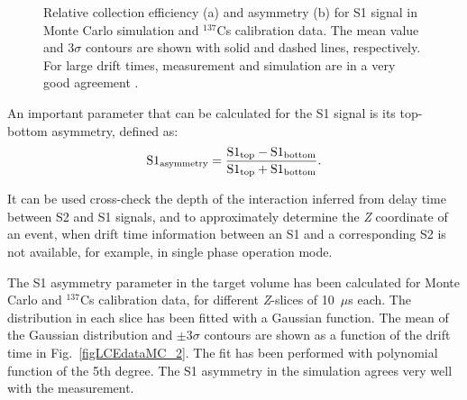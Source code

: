 \begin{figure}[!h]
\centering
{}
\caption[Relative collection efficiency and asymmetry for S1 signal in Monte Carlo simulation and $^{137}$Cs data]{Relative collection efficiency (a) and asymmetry (b) for S1 signal in Monte Carlo simulation and $^{137}$Cs calibration data. The mean value and 3$\sigma$ contours are shown with solid and dashed lines, respectively. For large drift times, measurement and simulation are in a very good agreement  .}
\label{figLCEdataMC}
\end{figure}

An important parameter that can be calculated for the S1 signal is its top-bottom asymmetry, defined as:
\begin{equation}
\mathrm{S}1_{\mathrm{asymmetry}} = \frac{\mathrm{S}1_{\mathrm{top}} \-- \mathrm{S}1_{\mathrm{bottom}}}{\mathrm{S}1_{\mathrm{top}} + \mathrm{S}1_{\mathrm{bottom}}}.
\end{equation}
 
It can be used cross-check the depth of the interaction inferred from delay time between S2 and S1 signals, and to approximately determine the {\it Z} coordinate of an event, when drift time information between an S1 and a corresponding S2 is not available, for example, in single phase operation mode.

The S1 asymmetry parameter in the target volume has been calculated for Monte Carlo and $^{137}$Cs calibration data, for different {\it Z}-slices of 10~$\mu$s each. The distribution in each slice has been fitted with a Gaussian function. The mean of the Gaussian distribution and $\pm$3$\sigma$ contours are shown as a function of the drift time in Fig.~\ref{figLCEdataMC_2}. The fit has been performed with polynomial function of the 5th degree. The S1 asymmetry in the simulation agrees very well with the measurement.


